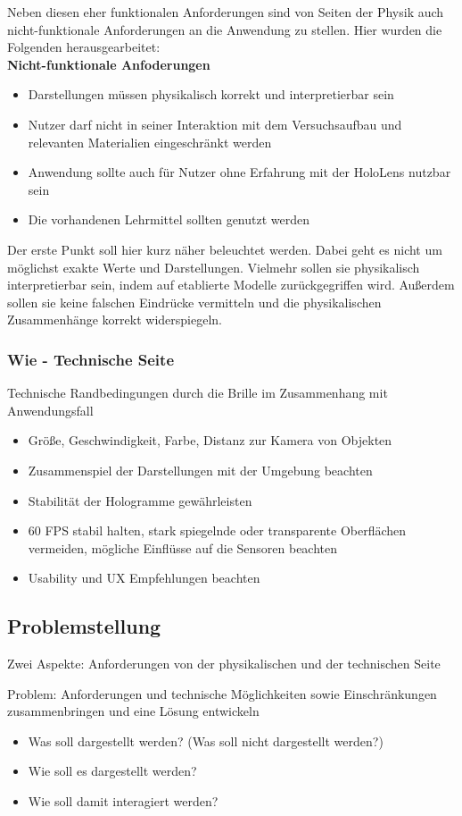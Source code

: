 Neben diesen eher funktionalen Anforderungen sind von Seiten der Physik auch nicht-funktionale Anforderungen an die Anwendung zu stellen. Hier wurden die Folgenden herausgearbeitet:\\
\textbf{Nicht-funktionale Anfoderungen}
\begin{itemize}
	\setlength{\itemsep}{-5pt}
	\item Darstellungen müssen physikalisch korrekt und interpretierbar sein
	\item Nutzer darf nicht in seiner Interaktion mit dem Versuchsaufbau und relevanten Materialien eingeschränkt werden
	\item Anwendung sollte auch für Nutzer ohne Erfahrung mit der HoloLens nutzbar sein
	\item Die vorhandenen Lehrmittel sollten genutzt werden
\end{itemize}
Der erste Punkt soll hier kurz näher beleuchtet werden. Dabei geht es nicht um möglichst exakte Werte und Darstellungen. Vielmehr sollen sie physikalisch interpretierbar sein, indem auf etablierte Modelle zurückgegriffen wird. Außerdem sollen sie keine falschen Eindrücke vermitteln und die physikalischen Zusammenhänge korrekt widerspiegeln.

\subsubsection{Wie - Technische Seite}
Technische Randbedingungen durch die Brille im Zusammenhang mit Anwendungsfall
\begin{itemize}
	\setlength{\itemsep}{-5pt}
	\item Größe, Geschwindigkeit, Farbe, Distanz zur Kamera von Objekten
	\item Zusammenspiel der Darstellungen mit der Umgebung beachten
	\item Stabilität der Hologramme gewährleisten
	\item 60 FPS stabil halten, stark spiegelnde oder transparente Oberflächen vermeiden, mögliche Einflüsse auf die Sensoren beachten
	\item Usability und UX Empfehlungen beachten
\end{itemize}

\subsection{Problemstellung}
\label{sec-3-2}
Zwei Aspekte: Anforderungen von der physikalischen und der technischen Seite

Problem: Anforderungen und technische Möglichkeiten sowie Einschränkungen zusammenbringen und eine Lösung entwickeln
\begin{itemize}
	\item Was soll dargestellt werden? (Was soll nicht dargestellt werden?)
	\item Wie soll es dargestellt werden?
	\item Wie soll damit interagiert werden?
\end{itemize}

